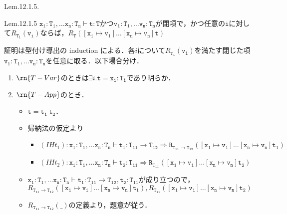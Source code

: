 \documentclass[9pt]{beamer}
\begin{document}
\begin{frame}{Lem.12.1.5.}
\begin{alertblock}{Lem.12.1.5}
$\mathtt{x_{1}:T_{1},\ldots x_{n}:T_{n}\vdash\mathtt{t:T}}$かつ$\mathtt{v_{1}:T_{1},\ldots v_{n}:T_{n}}$が閉項で，かつ任意の$\mathtt{i}$に対して$R_{\mathtt{T_{i}}}(\mathtt{v_{i}})$ならば，$R_{\mathtt{T}}(\mathtt{[x_{1}\mapsto v_{1}]\ldots[x_{n}\mapsto v_{n}]t})$
\end{alertblock}
証明は型付け導出の induction による．各$i$について$R_{\mathtt{T_{i}}}(\mathtt{v_{i}})$を満たす閉じた項$\mathtt{v_{1}:T_{1},\ldots v_{n}:T_{n}}$を任意に取る．以下場合分け．\begin{enumerate}
\item $\rn{T-Var}$のときは$\exists i.\mathtt{t = x_{i}:T_{i}}$であり明らか．
\item $\rn{T-App}$のとき．\begin{itemize}
\item $\mathtt{t = t_{1}\ t_{2}}$．
\item 帰納法の仮定より\begin{itemize}
\item $(IHt_{1}): \mathtt{x_{1}:T_{1},\ldots x_{n}:T_{n}\vdash t_{1}:T_{11}\to T_{12}\Rightarrow R_{T_{11}\to T_{12}}(\mathtt{[x_{1}\mapsto v_{1}]\ldots [x_{n}\mapsto v_{n}]t_{1}})}$
\item $(IHt_{2}): \mathtt{x_{1}:T_{1},\ldots x_{n}:T_{n}\vdash t_{2}:T_{11}\Rightarrow R_{\mathtt{T_{11}}}(\mathtt{[x_{1}\mapsto v_{1}]\ldots[x_{n}\mapsto v_{n}]t_{2}})}$
\end{itemize}
\item $\mathtt{x_{1}:T_{1},\ldots x_{n}:T_{n}\vdash t_{1}: T_{11}\to T_{12}, t_{2}:T_{11}}$が成り立つので，$R_{\mathtt{T_{11}\to T_{12}}}(\mathtt{[x_{1}\mapsto v_{1}]\ldots[x_{n}\mapsto v_{n}]t_{1}}), R_{\mathtt{T_{11}}}(\mathtt{[x_{1}\mapsto v_{1}]\ldots[x_{n}\mapsto v_{n}]t_{2}})$
\item $R_{\mathtt{T_{11}\to T_{12}}}(\_)$の定義より，題意が従う．
\end{itemize}
\end{enumerate}
\end{frame}
\end{document}
